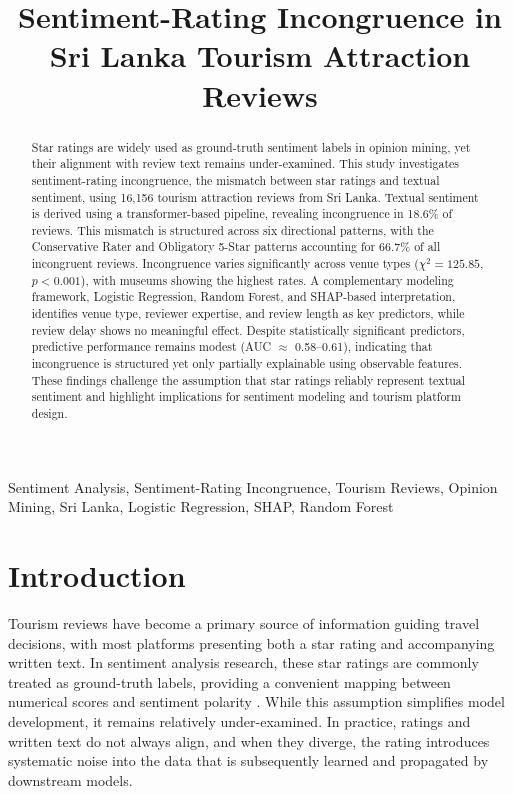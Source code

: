 \documentclass[conference]{IEEEtran}
\begin{document}
\title{Sentiment-Rating Incongruence in Sri Lanka Tourism Attraction Reviews}

\author{}

\maketitle

\begin{abstract}
Star ratings are widely used as ground-truth sentiment labels in opinion mining, yet their alignment with review text remains under-examined. This study investigates sentiment-rating incongruence, the mismatch between star ratings and textual sentiment, using 16,156 tourism attraction reviews from Sri Lanka. Textual sentiment is derived using a transformer-based pipeline, revealing incongruence in 18.6\% of reviews. This mismatch is structured across six directional patterns, with the Conservative Rater and Obligatory 5-Star patterns accounting for 66.7\% of all incongruent reviews. Incongruence varies significantly across venue types ($\chi^2 = 125.85$, $p < 0.001$), with museums showing the highest rates. A complementary modeling framework, Logistic Regression, Random Forest, and SHAP-based interpretation, identifies venue type, reviewer expertise, and review length as key predictors, while review delay shows no meaningful effect. Despite statistically significant predictors, predictive performance remains modest (AUC $\approx$ 0.58--0.61), indicating that incongruence is structured yet only partially explainable using observable features. These findings challenge the assumption that star ratings reliably represent textual sentiment and highlight implications for sentiment modeling and tourism platform design.
\end{abstract}

\begin{IEEEkeywords}
Sentiment Analysis, Sentiment-Rating Incongruence, Tourism Reviews, Opinion Mining, Sri Lanka, Logistic Regression, SHAP, Random Forest
\end{IEEEkeywords}

\section{Introduction}
Tourism reviews have become a primary source of information guiding travel decisions, with most platforms presenting both a star rating and accompanying written text. In sentiment analysis research, these star ratings are commonly treated as ground-truth labels, providing a convenient mapping between numerical scores and sentiment polarity \cite{pang2008opinion,alaei2019tourism}. While this assumption simplifies model development, it remains relatively under-examined. In practice, ratings and written text do not always align, and when they diverge, the rating introduces systematic noise into the data that is subsequently learned and propagated by downstream models.
\end{document}
